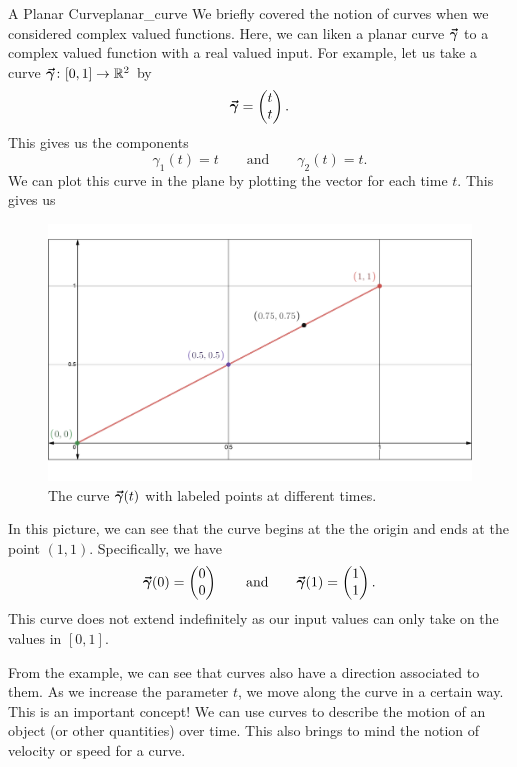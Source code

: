         \begin{ex}{A Planar Curve}{planar_curve}
        	We briefly covered the notion of curves when we considered complex valued functions.  Here, we can liken a planar curve $\boldsymbol{\vec{\gamma}}$ to a complex valued function with a real valued input.  For example, let us take a curve $\boldsymbol{\vec{\gamma}} \colon [0,1] \to \mathbb{R}^2$ by
        	\[
        	\boldsymbol{\vec{\gamma}} = \begin{pmatrix} t \\ t \end{pmatrix}.
        	\]
        	This gives us the components
        	\[
        	\gamma_1(t) = t \qquad \textrm{and} \qquad \gamma_2(t) = t.
        	\]
        	We can plot this curve in the plane by plotting the vector for each time $t$. This gives us
        	\begin{figure}[H]
        		\centering
        		\includegraphics[width=.9\textwidth]{Figures_Part_6/straight_line_curve.pdf}
        		\caption{The curve $\boldsymbol{\vec{\gamma}}(t)$ with labeled points at different times.}
        	\end{figure}
        	In this picture, we can see that the curve begins at the the origin and ends at the point $(1,1)$.  Specifically, we have
        	\[
        	\boldsymbol{\vec{\gamma}}(0) = \begin{pmatrix} 0 \\ 0 \end{pmatrix} \qquad \textrm{and} \qquad \boldsymbol{\vec{\gamma}}(1) = \begin{pmatrix} 1 \\ 1 \end{pmatrix}.
        	\]
        	This curve does not extend indefinitely as our input values can only take on the values in $[0,1]$.
        \end{ex}
        
        From the example, we can see that curves also have a direction associated to them.  As we increase the parameter $t$, we move along the curve in a certain way.  This is an important concept! We can use curves to describe the motion of an object (or other quantities) over time.  This also brings to mind the notion of velocity or speed for a curve.  
        
